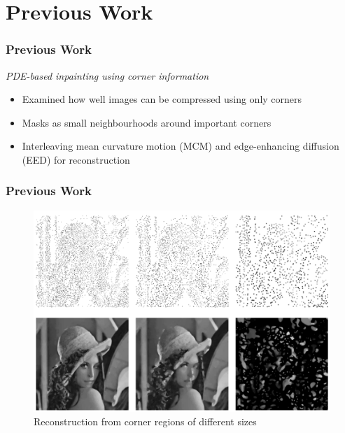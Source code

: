 \documentclass{beamer}
\begin{document}
    \section{Previous Work}
    \begin{frame}[t]
        \frametitle{Previous Work}
        \textit{PDE-based inpainting using corner information~\cite{zimmer07}}\nobreak
        \begin{itemize}[<+-|alert@+>]
            \item Examined how well images can be compressed using only corners
            \item Masks as small neighbourhoods around important corners
            \item Interleaving mean curvature motion (MCM) and edge-enhancing diffusion
                (EED) for reconstruction
        \end{itemize}     
    \end{frame}

    \begin{frame}[t]
        \frametitle{Previous Work}
        \begin{figure}
            \centering
            \includegraphics[width=\textheight]{../thesis/Images/zimmer_result.png}
            \caption{Reconstruction from corner regions of different sizes~\cite{zimmer07}}
        \end{figure}
    \end{frame}
\end{document}
